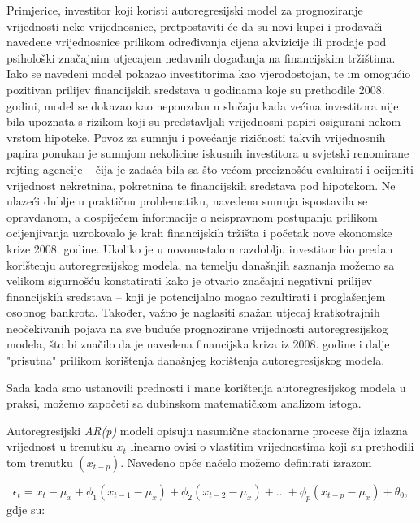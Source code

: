 \documentclass[a4paper,12pt,oneside]{memoir}
\begin{document}
            Primjerice, investitor koji koristi autoregresijski model za prognoziranje vrijednosti neke vrijednosnice, pretpostaviti će da su novi kupci i prodavači navedene vrijednosnice prilikom određivanja cijena akvizicije ili prodaje pod psihološki značajnim utjecajem nedavnih događanja na financijskim tržištima. Iako se navedeni model pokazao investitorima kao vjerodostojan, te im omogućio pozitivan prilijev financijskih sredstava u godinama koje su prethodile 2008. godini, model se dokazao kao nepouzdan u slučaju kada većina investitora nije bila upoznata s rizikom koji su predstavljali vrijednosni papiri osigurani nekom vrstom hipoteke. Povoz za sumnju i povećanje rizičnosti takvih vrijednosnih papira ponukan je sumnjom nekolicine iskusnih investitora u svjetski renomirane rejting agencije -- čija je zadaća bila sa što većom preciznošću evaluirati i ocijeniti vrijednost nekretnina, pokretnina te financijskih sredstava pod hipotekom. Ne ulazeći dublje u praktičnu problematiku, navedena sumnja ispostavila se opravdanom, a dospijećem informacije o neispravnom postupanju prilikom ocijenjivanja uzrokovalo je krah financijskih tržišta i početak nove ekonomske krize 2008. godine. Ukoliko je u novonastalom razdoblju investitor bio predan korištenju autoregresijskog modela, na temelju današnjih saznanja možemo sa velikom sigurnošću konstatirati kako je otvario značajni negativni prilijev financijskih sredstava -- koji je potencijalno mogao rezultirati i proglašenjem osobnog bankrota. Također, važno je naglasiti snažan utjecaj kratkotrajnih neočekivanih pojava na sve buduće prognozirane vrijednosti autoregresijskog modela, što bi značilo da je navedena financijska kriza iz 2008. godine i dalje "prisutna" prilikom korištenja današnjeg korištenja autoregresijskog modela.

            Sada kada smo ustanovili prednosti i mane korištenja autoregresijskog modela u praksi, možemo započeti sa dubinskom matematičkom analizom istoga.

            Autoregresijski \textit{AR(p)} modeli opisuju nasumične stacionarne procese čija izlazna vrijednost u trenutku $x_t$ linearno ovisi o vlastitim vrijednostima koji su prethodili tom trenutku $(x_{t-p})$. Navedeno opće načelo možemo definirati izrazom

            \begin{equation}
                \epsilon_t=x_t-\mu_x+\phi_1(x_{t-1}-\mu_x)+\phi_2(x_{t-2}-\mu_x)+\ldots+\phi_p(x_{t-p}-\mu_x)+\theta_0,
                \label{eq:51}
            \end{equation}
            gdje su:
\end{document}
